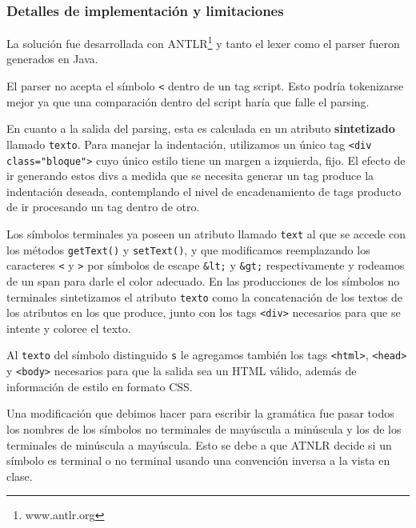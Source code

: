 \newpage
\subsubsection{Detalles de implementación y limitaciones}


La solución fue desarrollada con ANTLR\footnote{www.antlr.org} y tanto el lexer como el parser fueron generados en Java.

El parser no acepta el símbolo \verb|<| dentro de un tag script. Esto podría tokenizarse mejor ya que una comparación dentro del script haría que falle el parsing.

En cuanto a la salida del parsing, esta es calculada en un atributo \textbf{sintetizado} llamado \texttt{texto}. Para manejar la indentación, utilizamos un único tag \verb|<div class="bloque">| cuyo único estilo tiene un margen a izquierda, fijo. El efecto de ir generando estos divs a medida que se necesita generar un tag produce la indentación deseada, contemplando el nivel de encadenamiento de tags producto de ir procesando un tag dentro de otro.

% 

Los símbolos terminales ya poseen un atributo llamado \texttt{text} al que se accede con los métodos \texttt{getText()} y \texttt{setText()}, y que modificamos reemplazando los caracteres \texttt{<} y \texttt{>} por símbolos de escape \texttt{\&lt;} y \texttt{\&gt;} respectivamente y rodeamos de un span para darle el color adecuado. En las producciones de los símbolos no terminales sintetizamos el atributo \texttt{texto} como la concatenación de los textos de los atributos en los que produce, junto con los tags \texttt{<div>} necesarios para que se intente y coloree el texto. 

Al \texttt{texto} del símbolo distinguido \texttt{s} le agregamos también los tags \texttt{<html>}, \texttt{<head>} y \texttt{<body>} necesarios para que la salida sea un HTML válido, además de información de estilo en formato CSS.

Una modificación que debimos hacer para escribir la gramática fue pasar todos los nombres de los símbolos no terminales de mayúscula a minúscula y los de los terminales de minúscula a mayúscula. Esto se debe a que ATNLR decide si un símbolo es terminal o no terminal usando una convención inversa a la vista en clase.

